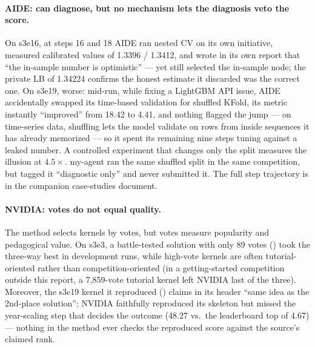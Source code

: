 \documentclass[11pt,a4paper]{article}
\begin{document}
\paragraph{AIDE: can diagnose, but no mechanism lets the diagnosis veto the score.} On s3e16, at steps 16 and 18 AIDE ran nested CV on its own initiative, measured calibrated values of 1.3396 / 1.3412, and wrote in its own report that ``the in-sample number is optimistic'' --- yet still selected the in-sample node; the private LB of 1.34224 confirms the honest estimate it discarded was the correct one. On s3e19, worse: mid-run, while fixing a LightGBM API issue, AIDE accidentally swapped its time-based validation for shuffled KFold, its metric instantly ``improved'' from 18.42 to 4.41, and nothing flagged the jump --- on time-series data, shuffling lets the model validate on rows from inside sequences it has already memorized --- so it spent its remaining nine steps tuning against a leaked number. A controlled experiment that changes only the split measures the illusion at $4.5\times$. my-agent ran the same shuffled split in the same competition, but tagged it ``diagnostic only'' and never submitted it. The full step trajectory is in the companion case-studies document.

\paragraph{NVIDIA: votes do not equal quality.}
\label{sec:votes}
The method selects kernels by votes, but votes measure popularity and pedagogical value. On s3e3, a battle-tested solution with only 89 votes () took the three-way best in development runs, while high-vote kernels are often tutorial-oriented rather than competition-oriented (in a getting-started competition outside this report, a 7{,}859-vote tutorial kernel left NVIDIA last of the three). Moreover, the s3e19 kernel it reproduced () claims in its header ``same idea as the 2nd-place solution''; NVIDIA faithfully reproduced its skeleton but missed the year-scaling step that decides the outcome (48.27 vs.\ the leaderboard top of 4.67) --- nothing in the method ever checks the reproduced score against the source's claimed rank.
\end{document}

